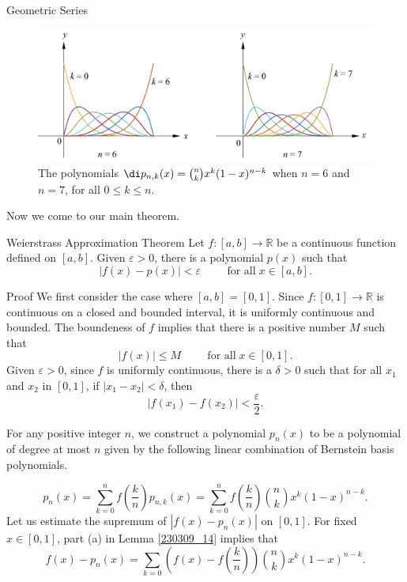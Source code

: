 \begin{example}[label=230305_16]{Geometric Series}
\begin{example}[label=230304_9]{}
\begin{example}{}
\begin{example}{}
\begin{figure}[ht]
\centering
\includegraphics[scale=0.2]{Picture67.png}
\caption{The polynomials $\di  p_{n,k}(x)=\binom{n}{k}x^k(1-x)^{n-k}$ when $n=6$ and $n=7$, for all $0\leq k\leq n$.\fa}\label{figure67}
\end{figure}

Now we come to our main theorem.
\begin{theorem}{Weierstrass Approximation Theorem}
Let $f:[a,b]\to\mathbb{R}$ be a continuous function defined on $[a, b]$. Given $\varepsilon>0$, there is a polynomial $p(x)$ such that
\[|f(x)-p(x)|<\varepsilon\hspace{1cm}\text{for all}\;x\in [a,b].\]
\end{theorem}
\begin{myproof}{Proof}
We first consider the case where $[a,b]=[0,1]$. Since $f:[0,1]\to\mathbb{R}$ is continuous on a closed and bounded interval, it is uniformly continuous and bounded. The boundeness of $f$ implies that there is a positive number $M$ such that
\[|f(x)|\leq M\hspace{1cm}\text{for all}\;x\in [0,1].\] Given $\varepsilon>0$, since $f$ is uniformly continuous, there is a $\delta>0$ such that for all $x_1$ and $x_2$ in $[0,1]$, if $|x_1-x_2|<\delta$, then 
\[|f(x_1)-f(x_2)|<\frac{\varepsilon}{2}.\]  

For any positive integer  $n$, we construct a polynomial $p_n(x)$ to be a polynomial of degree at most $n$ given by the following linear combination of Bernstein basis polynomials.\bp

\[p_n(x)=\sum_{k=0}^n f\left(\frac{k}{n}\right)p_{n,k}(x)=\sum_{k=0}^n f\left(\frac{k}{n}\right)\binom{n}{k}x^k(1-x)^{n-k}.\]  Let us estimate the supremum of $|f(x)-p_n(x)|$ on $[0,1]$. For fixed $x\in [0,1]$, part (a) in Lemma \ref{230309_14} implies that
\[
f(x)-p_n(x)=\sum_{k=0}\left(f(x)-f\left(\frac{k}{n}\right)\right)\binom{n}{k}x^k(1-x)^{n-k}.\] 
 

\end{myproof}
\end{example}
\end{example}
\end{example}
\end{example}
